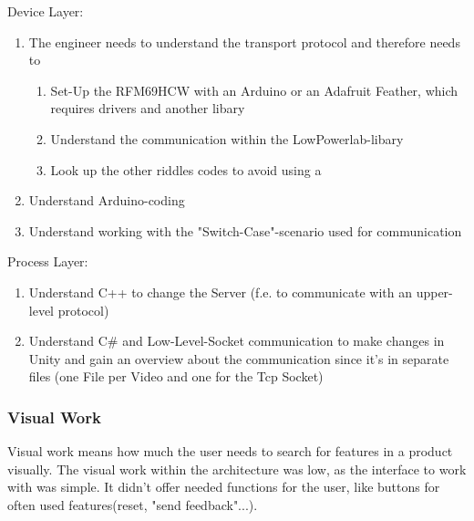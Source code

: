 Device Layer:
\begin{enumerate}
    \item The engineer needs to understand the transport protocol and therefore needs to 
    \begin{enumerate}
        \item Set-Up the RFM69HCW with an Arduino or an Adafruit Feather, which requires drivers and another libary
        \item Understand the communication within the LowPowerlab-libary
        \item Look up the other riddles codes to avoid using a %
    \end{enumerate}   
    \item Understand Arduino-coding 
    \item Understand working with the "Switch-Case"-scenario used for communication 
\end{enumerate}  

Process Layer:
\begin{enumerate}
    \item Understand C++ to change the Server (f.e. to communicate with an upper-level protocol)
    \item Understand C\# and Low-Level-Socket communication to make changes in Unity 
    and gain an overview about the communication since it's in separate files (one File per Video and one for the Tcp Socket) 
\end{enumerate}  

\subsubsection{Visual Work}
Visual work means how much the user needs to search for features in a product visually.
The visual work within the architecture was low, as the interface to work with was simple.
It didn't offer needed functions for the user, like buttons for often used features(reset, "send feedback"...).

